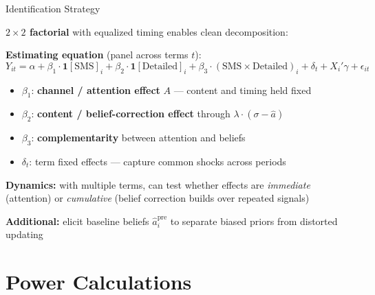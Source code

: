 \documentclass[aspectratio=169,11pt]{beamer}
\begin{document}
\begin{frame}{Identification Strategy}

\textbf{$2 \times 2$ factorial} with equalized timing enables clean decomposition:

\medskip

\textbf{Estimating equation} (panel across terms $t$):
\[
Y_{it} = \alpha + \beta_1 \cdot \mathbf{1}[\text{SMS}]_i + \beta_2 \cdot \mathbf{1}[\text{Detailed}]_i + \beta_3 \cdot (\text{SMS} \times \text{Detailed})_i + \delta_t + X_i'\gamma + \epsilon_{it}
\]

\begin{itemize}
    \item $\beta_1$: \textbf{channel / attention effect} $A$ --- content and timing held fixed
    \item $\beta_2$: \textbf{content / belief-correction effect} through $\lambda \cdot (\sigma - \hat{a})$
    \item $\beta_3$: \textbf{complementarity} between attention and beliefs
    \item $\delta_t$: term fixed effects --- capture common shocks across periods
\end{itemize}

\medskip

\textbf{Dynamics:} with multiple terms, can test whether effects are \emph{immediate} (attention) or \emph{cumulative} (belief correction builds over repeated signals)

\medskip

\textbf{Additional:} elicit baseline beliefs $\hat{a}_i^{\text{pre}}$ to separate biased priors from distorted updating

\end{frame}

\section{Power Calculations}
\end{document}
